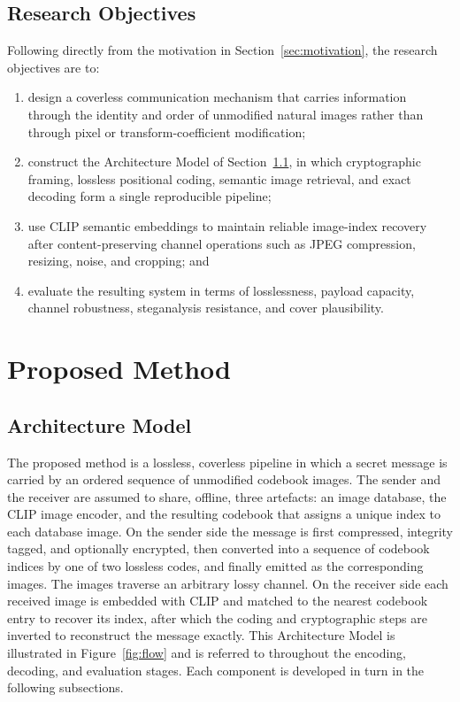 \documentclass[11pt]{article}
\theoremstyle{definition}
\newcommand{\Fig}[1]{Figure~\ref{#1}}
\begin{document}
\subsection{Research Objectives}\label{sec:objectives}
Following directly from the motivation in Section~\ref{sec:motivation}, the
research objectives are to:
\begin{enumerate}
  \item design a coverless communication mechanism that carries information through
        the identity and order of unmodified natural images rather than through
        pixel or transform-coefficient modification;
  \item construct the Architecture Model of Section~\ref{sec:architecture}, in
        which cryptographic framing, lossless positional coding, semantic image
        retrieval, and exact decoding form a single reproducible pipeline;
  \item use CLIP semantic embeddings to maintain reliable image-index recovery
        after content-preserving channel operations such as JPEG compression,
        resizing, noise, and cropping; and
  \item evaluate the resulting system in terms of losslessness, payload capacity,
        channel robustness, steganalysis resistance, and cover plausibility.
\end{enumerate}

\section{Proposed Method}\label{sec:method}
\subsection{Architecture Model}\label{sec:architecture}
The proposed method is a lossless, coverless pipeline in which a secret message is
carried by an ordered sequence of unmodified codebook images. The sender and the
receiver are assumed to share, offline, three artefacts: an image database, the
CLIP image encoder, and the resulting codebook that assigns a unique index to each
database image. On the sender side the message is first compressed, integrity
tagged, and optionally encrypted, then converted into a sequence of codebook
indices by one of two lossless codes, and finally emitted as the corresponding
images. The images traverse an arbitrary lossy channel. On the receiver side each
received image is embedded with CLIP and matched to the nearest codebook entry to
recover its index, after which the coding and cryptographic steps are inverted to
reconstruct the message exactly. This Architecture Model is illustrated in
\Fig{fig:flow} and is referred to throughout the encoding, decoding, and evaluation
stages. Each component is developed in turn in the following subsections.
\end{document}
